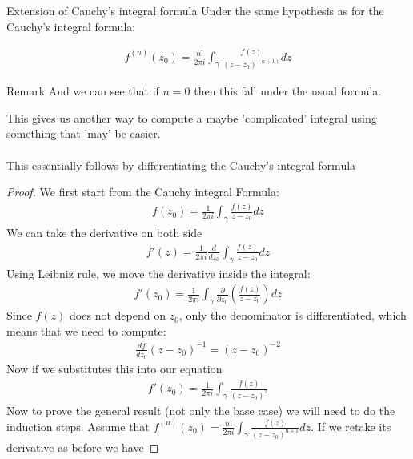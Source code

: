 \begin{parag}{Extension of Cauchy's integral formula}
    Under the same hypothesis as for the Cauchy's integral formula:
	\begin{theoreme}
	\begin{align*} 
		f^{\left(n\right)}\left(z_0\right) =  \frac{n!}{2\pi i}\int_{\gamma}\frac{f\left(z\right)}{\left(z - z_0\right)^{\left(n + 1\right)}}dz
	\end{align*}
	\end{theoreme}
	\begin{subparag}{Remark}
	    And we can see that if $n = 0$ then this fall under the usual formula.
	\end{subparag}
	This gives us another way to compute a maybe 'complicated' integral using something that 'may' be easier.\\
	$ $\\
	This essentially follows by differentiating the Cauchy's integral formula
	\begin{proof}
		We first start from the Cauchy integral Formula:
		\begin{align*} 
			f\left(z_0\right) = \frac{1}{2\pi i}\int_{\gamma}\frac{f\left(z\right)}{z - z_0}dz
		\end{align*}
		We can take the derivative on both side
		\begin{align*} 
			f'\left(z\right) = \frac{1}{2\pi i}\frac{d}{d z_0} \int_{\gamma} \frac{f\left(z\right)}{z - z_0}dz
		\end{align*}
		Using Leibniz rule, we move the derivative inside the integral:
		\begin{align*} 
			f'\left(z_0\right) = \frac{1}{2 \pi i} \int_{\gamma} \frac{\partial }{\partial z_0} \left(\frac{f\left(z\right)}{z - z_0}\right)dz
		\end{align*}
		Since $f\left(z\right)$ does not depend on $z_0$, only the denominator is differentiated, which means that we need to compute:
		\begin{align*} 
			\frac{df}{dz_0} \left(z - z_0\right)^{-1} = \left(z - z_0\right)^{-2}
		\end{align*}
		Now if we substitutes this into our equation
		\begin{align*} 
			f'\left(z_0\right) =  \frac{1}{2\pi i} \int_{\gamma} \frac{f\left(z\right)}{\left(z - z_0\right)^2}
		\end{align*}
		Now to prove the general result (not only the base case) we will need to do the induction steps. Assume that $f^{\left(n\right)}\left(z_0\right) =  \frac{n!}{2\pi i}\int_{\gamma}\frac{f\left(z\right)}{\left(z - z_0\right)^{n + 1}}dz$. If we retake its derivative as before we have 

\end{proof}
\end{parag}
